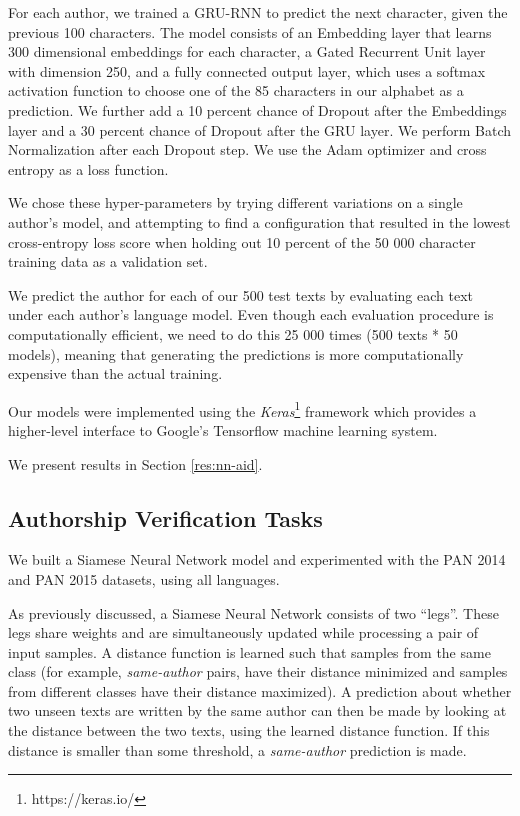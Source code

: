 For each author, we trained a GRU-RNN to predict the next character, given the previous 100 characters. The model consists of an Embedding layer that learns 300 dimensional embeddings for each character, a Gated Recurrent Unit layer with dimension 250, and a fully connected output layer, which uses a softmax activation function to choose one of the 85 characters in our alphabet as a prediction. We further add a 10 percent chance of Dropout after the Embeddings layer and a 30 percent chance of Dropout after the GRU layer. We perform Batch Normalization after each Dropout step. We use the Adam optimizer and cross entropy as a loss function.

We chose these hyper-parameters by trying different variations on a single author's model, and attempting to find a configuration that resulted in the lowest cross-entropy loss score when holding out 10 percent of the 50 000 character training data as a validation set.

We predict the author for each of our 500 test texts by evaluating each text under each author's language model. Even though each evaluation procedure is computationally efficient, we need to do this 25 000 times (500 texts * 50 models), meaning that generating the predictions is more computationally expensive than the actual training.

Our models were implemented using the \textit{Keras}\footnote{https://keras.io/} framework which provides a higher-level interface to Google's Tensorflow \cite{abadi2016tensorflow} machine learning system.

We present results in Section \ref{res:nn-aid}.

\subsection{Authorship Verification Tasks}
\label{mod:siamese}

We built a Siamese Neural Network model and experimented with the PAN 2014 and PAN 2015 datasets, using all languages. 

As previously discussed, a Siamese Neural Network consists of two ``legs''. These legs share weights and are simultaneously updated while processing a pair of input samples. A distance function is learned such that samples from the same class (for example, \textit{same-author} pairs, have their distance minimized and samples from different classes have their distance maximized). A prediction about whether two unseen texts are written by the same author can then be made by looking at the distance between the two texts, using the learned distance function. If this distance is smaller than some threshold, a \textit{same-author} prediction is made.

